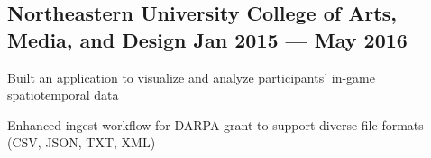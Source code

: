 \subsection{{Northeastern University College of Arts, Media, and Design \hfill Jan 2015 --- May 2016}}
\begin{zitemize}
\item Built an application to visualize and analyze participants' in-game spatiotemporal data
\item Enhanced ingest workflow for DARPA grant to support diverse file formats (CSV, JSON, TXT, XML)
\end{zitemize}



